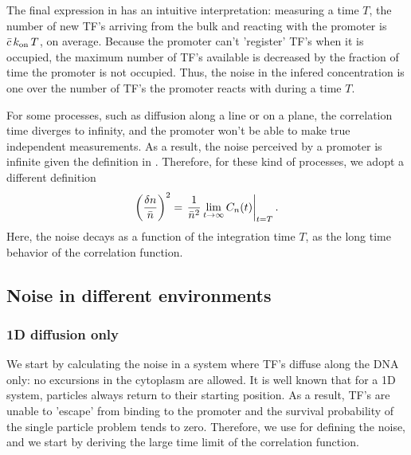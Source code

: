 The final expression in  has an intuitive interpretation: measuring a time $T$, the number of new TF's arriving from the bulk and reacting with the promoter is $\bar{c}\,k_{\rm on}\,T$, on average.  Because the promoter can't 'register' TF's when it is occupied, the maximum number of TF's available is decreased by the fraction of time the promoter is not occupied. Thus, the noise in the infered concentration is one over the number of TF's the promoter reacts with during a time $T$.

For some processes, such as diffusion along a line or on a plane, the correlation time diverges to infinity, and the promoter won't be able to make true independent measurements. As a result, the noise perceived by a promoter is infinite given the definition in . Therefore, for these kind of processes, we adopt a different definition
\begin{equation}
  \left( \frac{\delta n}{\bar{n}} \right)^2 = \left. \frac{1}{\bar{n}^2} \lim_{t \to \infty} C_n(t)  \right|_{t = T}.
  \elabel{EqProNoiseII}
\end{equation}
Here, the noise decays as a function of the integration time $T$, as the long time behavior of the correlation function.


\subsection{Noise in different environments}

\subsubsection{1D diffusion only}
We start by calculating the noise in a system where TF's diffuse along the DNA only: no excursions in the cytoplasm are allowed. It is well known \cite{Redner2001} that for a 1D system, particles always return to their starting position. As a result, TF's are unable to 'escape' from binding to the promoter and the survival probability of the single particle problem tends to zero. Therefore, we use  for defining the noise, and we start by deriving the large time limit of the correlation function.

